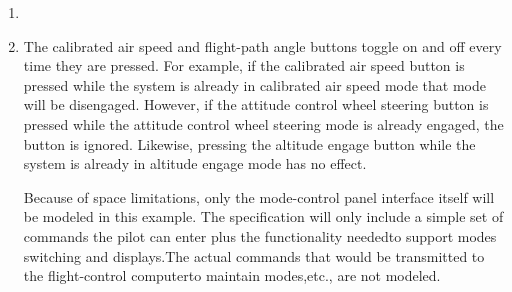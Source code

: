\documentclass{article}
\begin{document}
{\begin{enumerate}
\item {}

\item The calibrated air speed and flight-path angle buttons toggle on and off every time they are
pressed. For example, if the calibrated air speed button is pressed while the system is already in
calibrated air speed mode that mode will be disengaged. However, if the attitude control wheel
steering button is pressed while the attitude control wheel steering mode is already engaged, the
button is ignored. Likewise, pressing the altitude engage button while the system is already in
altitude engage mode has no effect.

Because of space limitations, only the mode-control panel interface itself will be modeled in this
example. The specification will only include a simple set of commands the pilot can enter plus the functionality neededto support modes switching and displays.The actual commands that would
be transmitted to the flight-control computerto maintain modes,etc., are not modeled.

\end{enumerate}
}
\end{document}
